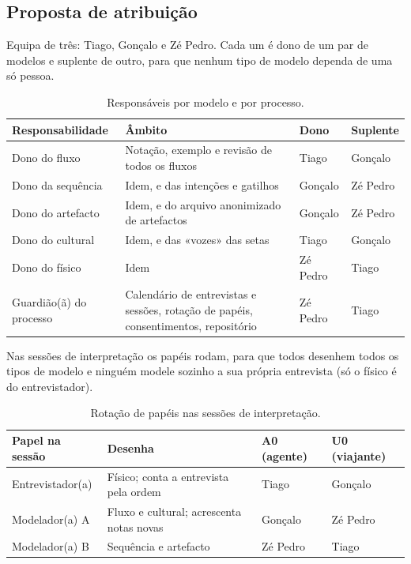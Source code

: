 \documentclass[11pt,a4paper]{article}
\begin{document}
\subsection{Proposta de atribuição}

Equipa de três: Tiago, Gonçalo e Zé Pedro. Cada um é dono de um par de modelos e suplente de outro, para que nenhum tipo de modelo dependa de uma só pessoa.

\begin{table}[h]
\centering\small
\begin{tabularx}{\textwidth}{@{}p{3.2cm}L p{2.2cm} p{2.2cm}@{}}
\toprule
\textbf{Responsabilidade} & \textbf{Âmbito} & \textbf{Dono} & \textbf{Suplente} \\
\midrule
Dono do fluxo & Notação, exemplo e revisão de todos os fluxos & Tiago & Gonçalo \\
Dono da sequência & Idem, e das intenções e gatilhos & Gonçalo & Zé Pedro \\
Dono do artefacto & Idem, e do arquivo anonimizado de artefactos & Gonçalo & Zé Pedro \\
Dono do cultural & Idem, e das «vozes» das setas & Tiago & Gonçalo \\
Dono do físico & Idem & Zé Pedro & Tiago \\
Guardião(ã) do processo & Calendário de entrevistas e sessões, rotação de papéis, consentimentos, repositório & Zé Pedro & Tiago \\
\bottomrule
\end{tabularx}
\caption{Responsáveis por modelo e por processo.}
\end{table}

Nas sessões de interpretação os papéis rodam, para que todos desenhem todos os tipos de modelo e ninguém modele sozinho a sua própria entrevista (só o físico é do entrevistador).

\begin{table}[h]
\centering\small
\begin{tabularx}{\textwidth}{@{}p{3.6cm}LLL@{}}
\toprule
\textbf{Papel na sessão} & \textbf{Desenha} & \textbf{A0 (agente)} & \textbf{U0 (viajante)} \\
\midrule
Entrevistador(a) & Físico; conta a entrevista pela ordem & Tiago & Gonçalo \\
Modelador(a) A & Fluxo e cultural; acrescenta notas novas & Gonçalo & Zé Pedro \\
Modelador(a) B & Sequência e artefacto & Zé Pedro & Tiago \\
\bottomrule
\end{tabularx}
\caption{Rotação de papéis nas sessões de interpretação.}
\end{table}
\end{document}
